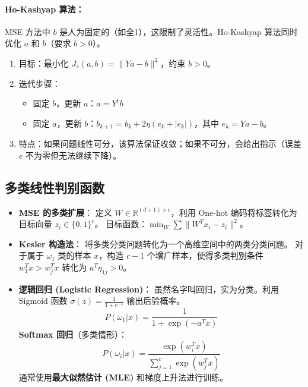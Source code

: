 \documentclass[a4paper, 11pt]{ctexart}
\begin{document}
\paragraph{Ho-Kashyap 算法：}
MSE 方法中 $b$ 是人为固定的（如全1），这限制了灵活性。Ho-Kashyap 算法同时优化 $a$ 和 $b$（要求 $b > 0$）。
\begin{enumerate}
    \item 目标：最小化 $J_s(a, b) = \|Ya - b\|^2$，约束 $b > 0$。
    \item 迭代步骤：
    \begin{itemize}
        \item 固定 $b$，更新 $a$：$a = Y^\dagger b$
        \item 固定 $a$，更新 $b$：$b_{k+1} = b_k + 2\eta (e_k + |e_k|)$，其中 $e_k = Ya - b$。
    \end{itemize}
    \item 特点：如果问题线性可分，该算法保证收敛；如果不可分，会给出指示（误差 $e$ 不为零但无法继续下降）。
\end{enumerate}

\subsection{多类线性判别函数}
\begin{itemize}
    \item \textbf{MSE 的多类扩展}：
    定义 $W \in \mathbb{R}^{(d+1) \times c}$，利用 One-hot 编码将标签转化为目标向量 $z_i \in \{0, 1\}^c$。
    目标函数：$\min_W \sum \|W^T x_i - z_i\|^2$。
    \item \textbf{Kesler 构造法}：
    将多类分类问题转化为一个高维空间中的两类分类问题。
    对于属于 $\omega_1$ 类的样本 $x$，构造 $c-1$ 个增广样本，使得多类判别条件 $w_1^T x > w_j^T x$ 转化为 $a^T \eta_{1j} > 0$。
    \item \textbf{逻辑回归 (Logistic Regression)}：
    虽然名字叫回归，实为分类。利用 Sigmoid 函数 $\sigma(z) = \frac{1}{1+e^{-z}}$ 输出后验概率。
    \begin{equation}
        P(\omega_1 | x) = \frac{1}{1 + \exp(-a^T x)}
    \end{equation}
    \textbf{Softmax 回归}（多类情形）：
    \begin{equation}
        P(\omega_i | x) = \frac{\exp(w_i^T x)}{\sum_{j=1}^c \exp(w_j^T x)}
    \end{equation}
    通常使用\textbf{最大似然估计 (MLE)} 和梯度上升法进行训练。
\end{itemize}
\end{document}
